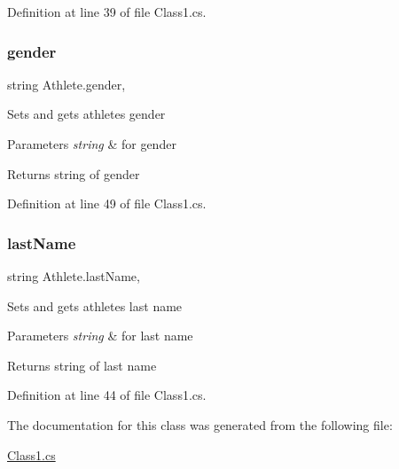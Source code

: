 Definition at line 39 of file Class1.\+cs.

\mbox{\label{classAthlete_a6606f4bf491738676ed79d3680bbe1b2}} 
\subsubsection{\texorpdfstring{gender}{gender}}
{\footnotesize\ttfamily string Athlete.\+gender\hspace{0.3cm}{\ttfamily [get]}, {\ttfamily [set]}}

Sets and gets athlete\textquotesingle{}s gender 
\begin{DoxyParams}{Parameters}
{\em string} & for gender \\
\hline
\end{DoxyParams}
\begin{DoxyReturn}{Returns}
string of gender 
\end{DoxyReturn}


Definition at line 49 of file Class1.\+cs.

\mbox{\label{classAthlete_a9d8f08579c9749c7f40965a100fc8b08}} 
\subsubsection{\texorpdfstring{last\+Name}{lastName}}
{\footnotesize\ttfamily string Athlete.\+last\+Name\hspace{0.3cm}{\ttfamily [get]}, {\ttfamily [set]}}

Sets and gets athlete\textquotesingle{}s last name 
\begin{DoxyParams}{Parameters}
{\em string} & for last name \\
\hline
\end{DoxyParams}
\begin{DoxyReturn}{Returns}
string of last name 
\end{DoxyReturn}


Definition at line 44 of file Class1.\+cs.



The documentation for this class was generated from the following file\+:\begin{DoxyCompactItemize}
\item 
\hyperlink{Class1_8cs}{Class1.\+cs}\end{DoxyCompactItemize}

